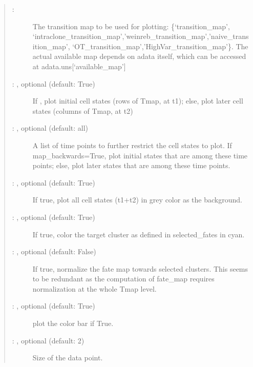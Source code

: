 \documentclass[letterpaper,10pt,english]{sphinxmanual}
\begin{document}
\begin{fulllineitems}
\begin{quote}
\begin{description}
\begin{description}
\item[{ : }] \leavevmode
The transition map to be used for plotting: \{‘transition\_map’,
‘intraclone\_transition\_map’,’weinreb\_transition\_map’,’naive\_transition\_map’,
‘OT\_transition\_map’,’HighVar\_transition\_map’\}. The actual available
map depends on adata itself, which can be accessed at adata.uns{[}‘available\_map’{]}

\item[{ : , optional (default: True)}] \leavevmode
If , plot initial cell states (rows of Tmap, at t1);
else, plot later cell states (columns of Tmap, at t2)

\item[{ : , optional (default: all)}] \leavevmode
A list of time points to further restrict the cell states to plot.
If map\_backwards=True, plot initial states that are among these time points;
else, plot later states that are among these time points.

\item[{ : , optional (default: True)}] \leavevmode
If true, plot all cell states (t1+t2) in grey color as the background.

\item[{ : , optional (default: True)}] \leavevmode
If true, color the target cluster as defined in selected\_fates in cyan.

\item[{ : , optional (default: False)}] \leavevmode
If true, normalize the fate map towards selected clusters. This
seems to be redundant as the computation of fate\_map requires
normalization at the whole Tmap level.

\item[{ : , optional (default: True)}] \leavevmode
plot the color bar if True.

\item[{ : , optional (default: 2)}] \leavevmode
Size of the data point.


\end{description}
\end{description}
\end{quote}
\end{fulllineitems}
\end{document}
